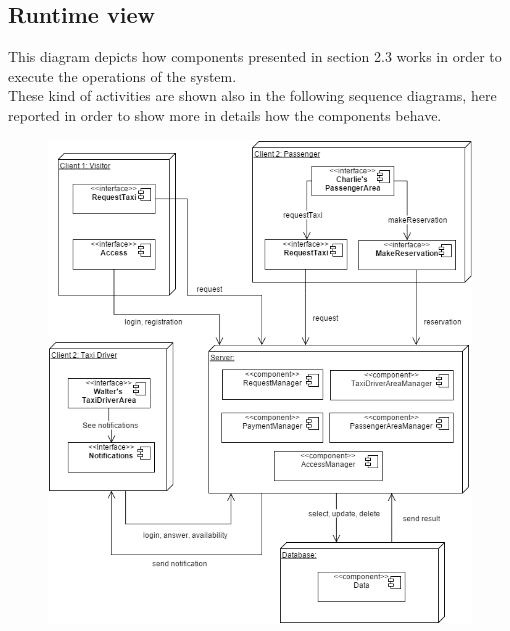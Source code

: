 		\subsection{Runtime view}
		This diagram depicts how components presented in section 2.3 works in order to execute the operations of the system.\\
		These kind of activities are shown also in the following sequence diagrams, here reported in order to show more in details how the components behave.
		\vspace{2cm}
			\begin{figure}[h]
				\centering
				\includegraphics[scale=0.55]{Diagrams/RunTimeView.png}
			\end{figure}
